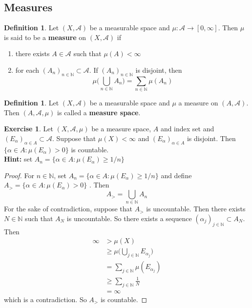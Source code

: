 \documentclass[12pt]{amsart}
\theoremstyle{definition}
\newtheorem{defn}[definition]{Definition}
\newtheorem{ex}[definition]{Exercise}
\newcommand{\al}{\alpha}
\newcommand{\N}{\mathbb{N}}
\newcommand{\MA}{\mathcal{A}}
\newcommand{\RG}{[0,\infty]}
\newcommand{\lex}[1]{\label{ex:#1}}
\newcommand{\ld}[1]{\label{defn:#1}}
\begin{document}
	
	
	
	
	
	
	
	
	
	
	
	
	
	
	
	\newpage
	\subsection{Measures}
	
	\begin{defn} \ld{00000} 
		Let $(X, \MA)$ be a measurable space and $\mu:\MA \rightarrow \RG$. Then $\mu$ is said to be a \textbf{measure} on $(X, \MA)$ if 
		\begin{enumerate}
			\item there exists $A \in \MA$ such that $\mu(A)< \infty$
			\item for each $(A_n)_{n \in \N} \subset \MA$. If $(A_n)_{n \in \N}$ is disjoint, then $$\mu\bigg(\bigcup_{n \in \N}A_n \bigg) = \sum_{n \in \N}\mu(A_n)$$
		\end{enumerate}
	\end{defn}
	
	\begin{defn} \ld{00000} 
		Let $(X,\MA)$ be a measurable space and $\mu$ a measure on $(A, \MA)$. Then $(A, \MA, \mu)$ is called a \textbf{measure space}. 
	\end{defn}
	
	\begin{ex} \lex{00000} 
	Let $(X, \MA, \mu)$ be a measure space, $A$ and index set and $(E_{\al})_{\al \in A} \subset \MA$. Suppose that $\mu(X) < \infty$ and $(E_\al)_{\al \in A }$ is disjoint. Then $\{\al \in A: \mu(E_{\al}) >0\}$ is countable.\\
	\textbf{Hint:} set $A_n = \{\al \in A: \mu(E_{\al}) \geq 1/n \}$ 
	\end{ex}
	
	\begin{proof}
	For $n \in \N$, set $A_n = \{\al \in A: \mu(E_{\al}) \geq 1/n \}$ and define $ A_> = \{\al \in A: \mu(E_{\al}) >0\}$ . Then 
	$$A_> = \bigcup_{n \in \N}A_n$$
	For the sake of contradiction, suppose that 
	$A_>$ is uncountable. Then there exists $N \in \N$ such that $A_N$ is uncountable. So there exists a sequence $(\al_j)_{j \in \N} \subset A_N$. Then 
	\begin{align*}
	\infty 
	& > \mu(X) \\
	& \geq \mu \bigg( \bigcup_{j \in \N} E_{\al_{j}} \bigg) \\
	&= \sum_{j \in \N} \mu(E_{\al_j}) \\
	& \geq \sum_{j \in \N} \frac{1}{N} \\
	&= \infty
	\end{align*} 
	which is a contradiction. So $A_>$ is countable.
	\end{proof}
	
\end{document}
